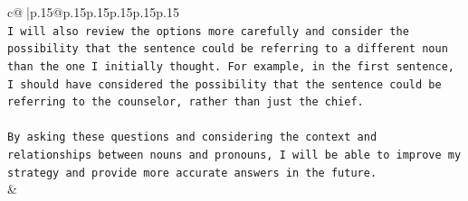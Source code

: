 \documentclass{article}
\begin{document}
{\begin{supertabular}{c@{$\;$}|p{.15\linewidth}@{}p{.15\linewidth}p{.15\linewidth}p{.15\linewidth}p{.15\linewidth}p{.15\linewidth}}
{{{\\ 
\texttt{I will also review the options more carefully and consider the possibility that the sentence could be referring to a different noun than the one I initially thought. For example, in the first sentence, I should have considered the possibility that the sentence could be referring to the counselor, rather than just the chief.} \\
\\ 
\texttt{By asking these questions and considering the context and relationships between nouns and pronouns, I will be able to improve my strategy and provide more accurate answers in the future.} \\
            }
        }
    }
    & \\ \\

\end{supertabular}
}
\end{document}

